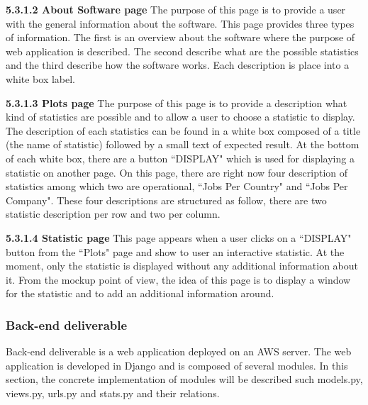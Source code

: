 \documentclass[conference,compsoc]{IEEEtran}
\begin{document}
\noindent
\newline\newline
\textbf{5.3.1.2 About Software page}
\newline\newline  
The purpose of this page is to provide a user with the general information about the software. This page provides three types of information. The first is an overview about the software where the purpose of web application is described. The second describe what are the possible statistics and the third describe how the software works. Each description is place into a white box label. 

\noindent
\newline\newline
\textbf{5.3.1.3 Plots page}
\newline\newline    
The purpose of this page is to provide a description what kind of statistics are possible and to allow a user to choose a statistic to display. The description of each statistics can be found in a white box composed of a title (the name of statistic) followed by a small text of expected result. At the bottom of each white box, there are a button ``DISPLAY" which is used for displaying a statistic on another page.                                                                                                                                                       \newline                  
On this page, there are right now four description of statistics among which two are operational, ``Jobs Per Country" and ``Jobs Per Company".  These four descriptions are structured as follow, there are two statistic description per row and two per column.                   

\noindent
\newline\newline
\textbf{5.3.1.4 Statistic page}
\newline\newline
This page appears when a user clicks on a ``DISPLAY" button from the ``Plots" page and show to user an interactive statistic. At the moment, only the statistic is displayed without any additional information about it. From the mockup point of view, the idea of this page is to display a window for the statistic and to add an additional information around.  

\subsubsection{Back-end deliverable}    
Back-end deliverable is a web application deployed on an AWS server. The web application is developed in Django and is composed of several modules. In this section, the concrete implementation of modules will be described such models.py, views.py, urls.py and stats.py and their relations. 
\end{document}

